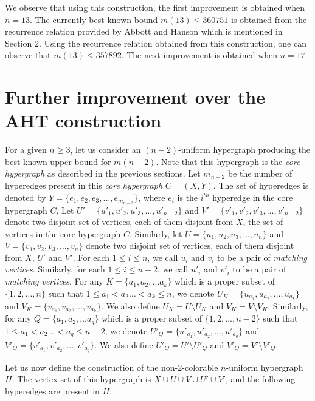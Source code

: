 \documentclass[11pt]{article}
\begin{document}
We observe that using this construction, the first improvement is obtained when $n = 13$. The currently best known bound $m(13) \leq 360751$ is obtained from the recurrence relation provided by Abbott and Hanson \cite{Abbott} which is mentioned in Section $2$. Using the recurrence relation obtained from this construction, one can observe that $m(13) \leq 357892$. The next improvement is obtained when $n = 17$.


\section{Further improvement over the AHT construction}

For a given $n \geq 3$, let us consider an $(n-2)$-uniform hypergraph producing the best known upper bound for $m(n-2)$. Note that this hypergraph is the {\it core hypergraph} as described in the previous sections. Let $m_{n-2}$ be the number of hyperedges present in this \textit{core hypergraph} $C =(X, Y)$. The set of hyperedges is denoted by 
$Y = \{e_1, e_2, e_3, \ldots, e_{m_{n-2}}\}$, where $e_i$ is the $i^{th}$ hyperedge in the core hypergraph $C$. 
Let $U' = \{u'_1, u'_2, u'_3, \ldots, u'_{n-2}\}$ and $V' = \{v'_1, v'_2, v'_3, \ldots, v'_{n-2}\}$ denote two disjoint set of vertices, each of them disjoint from $X$, the set of vertices in the core hypergraph $C$.
Similarly, let $U = \{u_1, u_2, u_3, \ldots, u_n\}$ and $V = \{v_1, v_2, v_3, \ldots, v_n\}$ denote two disjoint set of vertices, each of them disjoint from $X$, $U'$ and $V'$. For each $1 \leq i \leq n$, we call $u_i$ and $v_i$ to be a pair of {\it matching vertices}. Similarly, for each $1 \leq i \leq n-2$, we call $u'_i$ and $v'_i$ to be a pair of {\it matching vertices}. For any $K =  \{a_1, a_2, \ldots a_k\}$ which is a proper subset of $\{1, 2, \ldots, n\}$ such that $1 \leq a_1 < a_2 \ldots < a_k \leq n$, we denote $U_K = \{u_{a_1}, u_{a_2}, \ldots, u_{a_k}\}$ and $V_K = \{v_{a_1}, v_{a_2}, \ldots, v_{a_k}\}$. We also define 
${\bar{U}}_K = U \setminus U_K$ and ${\bar{V}}_K = V \setminus V_K$. Similarly, for any $Q =  \{a_1, a_2, \ldots a_q\}$ which is a proper subset of $\{1, 2, \ldots, n-2\}$ such that $1 \leq a_1 < a_2 \ldots < a_q \leq n-2$, we denote $U'_Q = \{u'_{a_1}, u'_{a_2}, \ldots, u'_{a_q}\}$ and $V'_Q = \{v'_{a_1}, v'_{a_2}, \ldots, v'_{a_q}\}$. We also define 
${\bar{U'}}_Q = U' \setminus U'_Q$ and ${\bar{V'}}_Q = V' \setminus V'_Q$.


Let us now define the construction of the non-$2$-colorable $n$-uniform hypergraph $H$. The vertex set of this hypergraph is $X \cup U \cup V \cup U' \cup V'$, and the following hyperedges are present in $H$:\\
\end{document}
